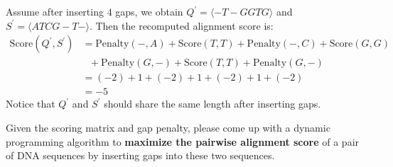 Assume after inserting $4$ gaps, we obtain $Q^\prime=\langle -T-GGTG\rangle$ and $S^\prime=\langle ATCG-T-\rangle$. Then the recomputed alignment score is:
\[
	\begin{aligned}
		\text{Score}(Q^\prime, S^\prime) & = \text{Penalty}(-, A) +\text{Score}(T, T)+\text{Penalty}(-, C) + \text{Score}(G, G) \\
		                                 & \ \ \  +\text{Penalty}(G, -)+\text{Score}(T, T)+ \text{Penalty}(G, -)               \\
		                                 & = (-2)+1+(-2)+1+(-2)+1+(-2)                                                          \\
		                                 & = -5
	\end{aligned}
\]
Notice that $Q^\prime$ and $S^\prime$ should share the same length after inserting gaps.


Given the scoring matrix and gap penalty, please come up with a dynamic programming algorithm to \textbf{maximize the pairwise alignment score} of a pair of DNA sequences by inserting gaps into these two sequences.


